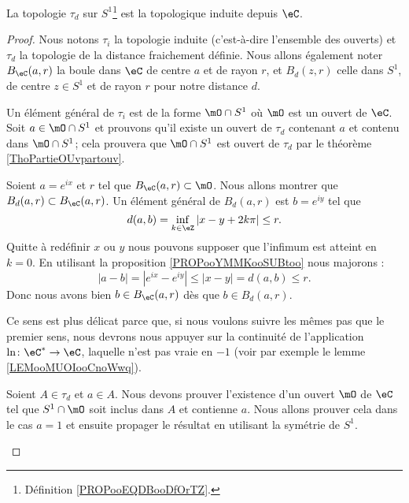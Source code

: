 \begin{proposition}
	La topologie \( \tau_d\) sur \( S^1\)\footnote{Définition \ref{PROPooEQDBooDfOrTZ}.} est la topologique induite depuis \( \eC\).
\end{proposition}

\begin{proof}
	Nous notons \( \tau_i\) la topologie induite (c'est-à-dire l'ensemble des ouverts) et \( \tau_d\) la topologie de la distance fraichement définie. Nous allons également noter \( B_{\eC}(a,r)\) la boule dans \( \eC\) de centre \( a\) et de rayon \( r\), et \( B_d(z,r)\) celle dans \( S^1\), de centre \( z\in S^1\) et de rayon \( r\) pour notre distance \( d\).
	\begin{subproof}

		Un élément général de \( \tau_i\) est de la forme \( \mO\cap S^1\) où \( \mO\) est un ouvert de \( \eC\). Soit \( a\in \mO\cap S^1\) et prouvons qu'il existe un ouvert de \( \tau_d\) contenant \( a\) et contenu dans \( \mO\cap S^1\); cela prouvera que \( \mO\cap S^1\) est ouvert de \( \tau_d\) par le théorème \ref{ThoPartieOUvpartouv}.

		Soient \( a= e^{ix}\) et \( r\) tel que \( B_{\eC}(a,r)\subset \mO\). Nous allons montrer que \( B_{d}(a,r)\subset B_{\eC}(a,r)\). Un élément général de \( B_d(a,r)\) est \( b= e^{iy}\) tel que
		\begin{equation}
			d(a,b)=\inf_{k\in \eZ}| x-y+2k\pi |\leq r.
		\end{equation}
		Quitte à redéfinir \( x\) ou \( y\) nous pouvons supposer que l'infimum est atteint en \( k=0\). En utilisant la proposition \ref{PROPooYMMKooSUBtoo} nous majorons :
		\begin{equation}
			| a-b |=|  e^{ix}- e^{iy} |\leq | x-y |=d(a,b)\leq r.
		\end{equation}
		Donc nous avons bien \( b\in B_{\eC}(a,r)\) dès que \( b\in B_d(a,r)\).


		Ce sens est plus délicat parce que, si nous voulons suivre les mêmes pas que le premier sens, nous devrons nous appuyer sur la continuité de l'application \( \ln\colon \eC^*\to \eC\), laquelle n'est pas vraie en \( -1\) (voir par exemple le lemme \ref{LEMooMUOIooCnoWwq}).

		Soient \( A\in \tau_d\) et \( a\in A\). Nous devons prouver l'existence d'un ouvert \( \mO\) de \( \eC\) tel que \( S^1\cap\mO\) soit inclus dans \( A\) et contienne \( a\). Nous allons prouver cela dans le cas \( a=1\) et ensuite propager le résultat en utilisant la symétrie de \( S^1\).


\end{subproof}
\end{proof}
